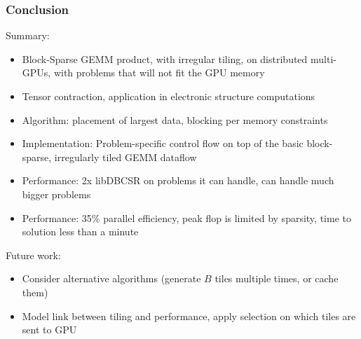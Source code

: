 \begin{frame}
  \frametitle{Conclusion}

  Summary:
  \begin{itemize}
  \item Block-Sparse GEMM product, with irregular tiling, on distributed multi-GPUs, with problems that will not fit the GPU memory
  \item Tensor contraction, application in electronic structure computations
  \item Algorithm: placement of largest data, blocking per memory constraints
  \item Implementation: Problem-specific control flow on top of the basic block-sparse, irregularly tiled GEMM dataflow
  \item Performance: 2x libDBCSR on problems it can handle, can handle much bigger problems
  \item Performance: 35\% parallel efficiency, peak flop is limited by
    sparsity, time to solution less than a minute
  \end{itemize}

  Future work:
  \begin{itemize}
  \item Consider alternative algorithms (generate $B$ tiles multiple times, or cache them)
  \item Model link between tiling and performance, apply selection on which tiles are sent to GPU
  \end{itemize}
  
\end{frame}

